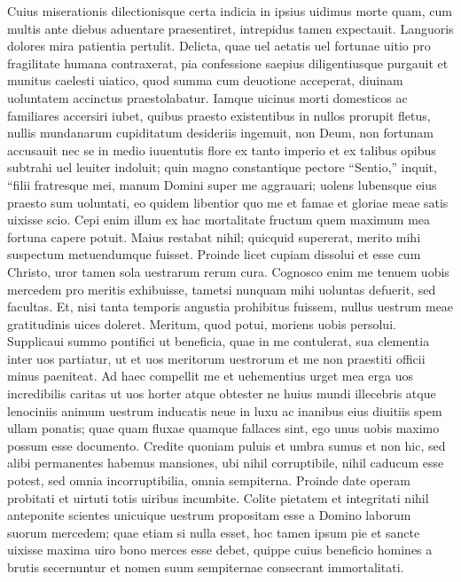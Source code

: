 \documentclass[a5paper,twoside]{article}
\begin{document}
Cuius miserationis dilectionisque certa indicia in ipsius uidimus morte quam, cum multis ante diebus aduentare praesentiret, intrepidus tamen expectauit.  Languoris dolores mira patientia pertulit.   Delicta, quae uel aetatis uel fortunae uitio pro fragilitate humana contraxerat, pia confessione saepius diligentiusque purgauit et munitus caelesti uiatico, quod summa cum deuotione acceperat, diuinam uoluntatem accinctus praestolabatur.  Iamque uicinus morti domesticos ac familiares accersiri iubet, quibus praesto existentibus in nullos prorupit fletus, nullis mundanarum cupiditatum desideriis ingemuit, non Deum, non fortunam accusauit nec se in medio iuuentutis flore ex tanto imperio et ex talibus opibus subtrahi uel leuiter indoluit; quin magno constantique pectore ``Sentio,'' inquit, ``filii fratresque mei, manum Domini super me aggrauari; uolens lubensque eius praesto sum uoluntati, eo quidem libentior quo me et famae et gloriae meae satis uixisse scio.  Cepi enim illum ex hac mortalitate fructum quem maximum mea fortuna capere potuit.   Maius restabat nihil; quicquid supererat, merito mihi suspectum metuendumque fuisset.   Proinde licet cupiam dissolui et esse cum Christo, uror tamen sola uestrarum rerum cura.  Cognosco enim me tenuem uobis mercedem pro meritis exhibuisse, tametsi nunquam mihi uoluntas defuerit, sed facultas.  Et, nisi tanta temporis angustia prohibitus fuissem, nullus uestrum meae gratitudinis uices doleret.  Meritum, quod potui, moriens uobis persolui.  Supplicaui summo pontifici ut beneficia, quae in me contulerat, sua clementia inter uos partiatur, ut et uos meritorum uestrorum et me non praestiti officii minus paeniteat.  Ad haec compellit me et uehementius urget mea erga uos incredibilis caritas ut uos horter atque obtester ne huius mundi illecebris atque lenociniis animum uestrum inducatis neue in luxu ac inanibus eius diuitiis spem ullam ponatis; quae quam fluxae quamque fallaces sint, ego unus uobis maximo possum esse documento.   Credite quoniam puluis et umbra sumus et non hic, sed alibi permanentes habemus mansiones, ubi nihil corruptibile, nihil caducum esse potest, sed omnia incorruptibilia, omnia sempiterna.  Proinde date operam probitati et uirtuti totis uiribus incumbite.  Colite pietatem et integritati nihil anteponite scientes unicuique uestrum propositam esse a Domino laborum suorum mercedem; quae etiam si nulla esset, hoc tamen ipsum pie et sancte uixisse maxima uiro bono merces esse debet, quippe cuius beneficio homines a brutis secernuntur et nomen suum sempiternae consecrant immortalitati.
\end{document}
